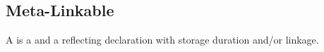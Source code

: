 \subsection{Meta-Linkable}
\label{concept-Meta-Linkable}

A  is a  and a  reflecting declaration with storage duration and/or linkage. 





